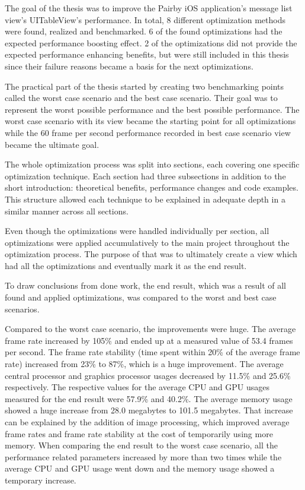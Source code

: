 \documentclass[a4paper,12pt]{article}
\begin{document}
The goal of the thesis was to improve the Pairby iOS application's message list view's UITableView's performance. In total, 8 different optimization methods were found, realized and benchmarked. 6 of the found optimizations had the expected performance boosting effect. 2 of the optimizations did not provide the expected performance enhancing benefits, but were still included in this thesis since their failure reasons became a basis for the next optimizations.

The practical part of the thesis started by creating two benchmarking points called the worst case scenario and the best case scenario. Their goal was to represent the worst possible performance and the best possible performance. The worst case scenario with its  view became the starting point for all optimizations while the 60 frame per second performance recorded in best case scenario view became the ultimate goal.

The whole optimization process was split into sections, each covering one specific optimization technique. Each section had three subsections in addition to the short introduction: theoretical benefits, performance changes and code examples. This structure allowed each technique to be explained in adequate depth in a similar manner across all sections.

Even though the optimizations were handled individually per section, all optimizations were applied accumulatively to the main project throughout the optimization process. The purpose of that was to ultimately create a view which had all the optimizations and eventually mark it as the end result.

To draw conclusions from done work, the end result, which was a result of all found and applied optimizations, was compared to the worst and best case scenarios.

Compared to the worst case scenario, the improvements were huge. The average frame rate increased by 105\% and ended up at a measured value of 53.4 frames per second. The frame rate stability (time spent within 20\% of the average frame rate) increased from 23\% to 87\%, which is a huge improvement. The average central processor and graphics processor usages decreased by 11.5\% and 25.6\% respectively. The respective values for the average CPU and GPU usages measured for the end result were 57.9\% and 40.2\%. The average memory usage showed a huge increase from 28.0 megabytes to 101.5 megabytes. That increase can be explained by the addition of image processing, which improved average frame rates and frame rate stability at the cost of temporarily using more memory. When comparing the end result to the worst case scenario, all the performance related parameters increased by more than two times while the average CPU and GPU usage went down and the memory usage showed a temporary increase.
\end{document}

